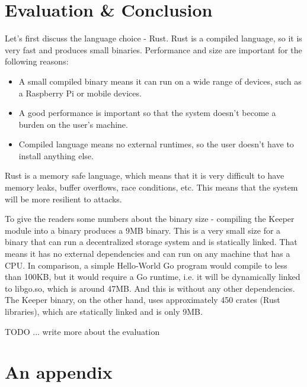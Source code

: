 \documentclass[ twoside,openright,titlepage,numbers=noenddot,headinclude,%
                footinclude=true,cleardoublepage=empty,abstractoff, %
                BCOR=5mm,paper=a4,fontsize=11pt,%
                ngerman,american,%
                ]{scrreprt}
\begin{document}
\chapter{Evaluation \& Conclusion}
\label{cha:evaluation}

Let's first discuss the language choice - Rust.
Rust is a compiled language, so it is very fast and produces small binaries.
Performance and size are important for the following reasons:
\begin{itemize}
    \item A small compiled binary means it can run on a wide range of devices, such as a Raspberry Pi or mobile devices.
    \item A good performance is important so that the system doesn't become a burden on the user's machine.
    \item Compiled language means no external runtimes, so the user doesn't have to install anything else.
\end{itemize}

Rust is a memory safe language, which means that it is very difficult to have memory leaks, buffer overflows, race conditions, etc.
This means that the system will be more resilient to attacks.

To give the readers some numbers about the binary size - compiling the Keeper module into a binary produces a 9MB binary.
This is a very small size for a binary that can run a decentralized storage system and is statically linked.
That means it has no external dependencies and can run on any machine that has a CPU.
In comparison, a simple Hello-World Go program would compile to less than 100KB,
but it would require a Go runtime, i.e. it will be dynamically linked to libgo.so, which is around 47MB.
And this is without any other dependencies.
The Keeper binary, on the other hand, uses approximately 450 crates (Rust libraries), which are statically linked and is only 9MB.

TODO ... write more about the evaluation


\appendix
\chapter{An appendix}
\label{cha:an-appendix}

\printbibliography
\end{document}
